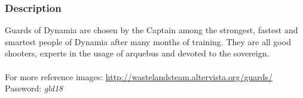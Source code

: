 \subsubsection{Description}
Guards of Dynamia are chosen by the Captain among the strongest, fastest and smartest people of Dynamia after many months of training. They are all good shooters, experts in the usage of arquebus and devoted to the sovereign.\\\\
For more reference images: \href{http://wastelandsteam.altervista.org/guards/}{http://wastelandsteam.altervista.org/guards/}\\
Password: \textit{gld18}



